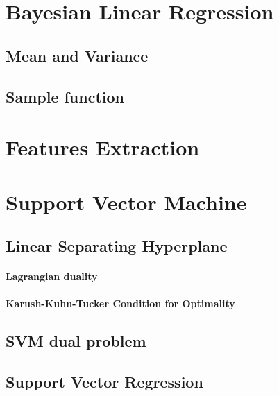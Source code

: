 \section{Bayesian Linear Regression}

	\subsection{Mean and Variance}

	\subsection{Sample function}

\section{Features Extraction}

\section{Support Vector Machine}

	\subsection{Linear Separating Hyperplane}

		\paragraph*{Lagrangian duality}
		\paragraph*{Karush-Kuhn-Tucker Condition for Optimality}
	\subsection{SVM dual problem}

	\subsection{Support Vector Regression}





